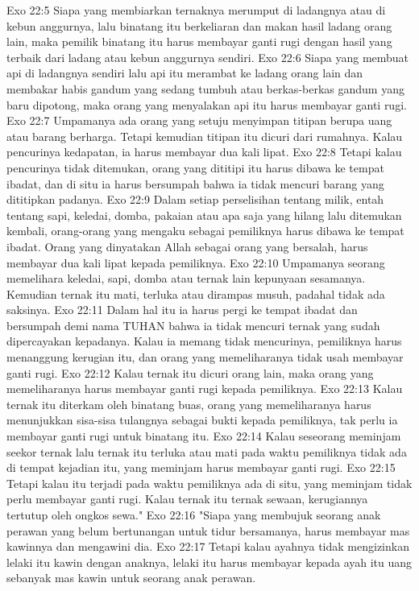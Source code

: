 Exo 22:5  Siapa yang membiarkan ternaknya merumput di ladangnya atau di kebun anggurnya, lalu binatang itu berkeliaran dan makan hasil ladang orang lain, maka pemilik binatang itu harus membayar ganti rugi dengan hasil yang terbaik dari ladang atau kebun anggurnya sendiri.
Exo 22:6  Siapa yang membuat api di ladangnya sendiri lalu api itu merambat ke ladang orang lain dan membakar habis gandum yang sedang tumbuh atau berkas-berkas gandum yang baru dipotong, maka orang yang menyalakan api itu harus membayar ganti rugi.
Exo 22:7  Umpamanya ada orang yang setuju menyimpan titipan berupa uang atau barang berharga. Tetapi kemudian titipan itu dicuri dari rumahnya. Kalau pencurinya kedapatan, ia harus membayar dua kali lipat.
Exo 22:8  Tetapi kalau pencurinya tidak ditemukan, orang yang dititipi itu harus dibawa ke tempat ibadat, dan di situ ia harus bersumpah bahwa ia tidak mencuri barang yang dititipkan padanya.
Exo 22:9  Dalam setiap perselisihan tentang milik, entah tentang sapi, keledai, domba, pakaian atau apa saja yang hilang lalu ditemukan kembali, orang-orang yang mengaku sebagai pemiliknya harus dibawa ke tempat ibadat. Orang yang dinyatakan Allah sebagai orang yang bersalah, harus membayar dua kali lipat kepada pemiliknya.
Exo 22:10  Umpamanya seorang memelihara keledai, sapi, domba atau ternak lain kepunyaan sesamanya. Kemudian ternak itu mati, terluka atau dirampas musuh, padahal tidak ada saksinya.
Exo 22:11  Dalam hal itu ia harus pergi ke tempat ibadat dan bersumpah demi nama TUHAN bahwa ia tidak mencuri ternak yang sudah dipercayakan kepadanya. Kalau ia memang tidak mencurinya, pemiliknya harus menanggung kerugian itu, dan orang yang memeliharanya tidak usah membayar ganti rugi.
Exo 22:12  Kalau ternak itu dicuri orang lain, maka orang yang memeliharanya harus membayar ganti rugi kepada pemiliknya.
Exo 22:13  Kalau ternak itu diterkam oleh binatang buas, orang yang memeliharanya harus menunjukkan sisa-sisa tulangnya sebagai bukti kepada pemiliknya, tak perlu ia membayar ganti rugi untuk binatang itu.
Exo 22:14  Kalau seseorang meminjam seekor ternak lalu ternak itu terluka atau mati pada waktu pemiliknya tidak ada di tempat kejadian itu, yang meminjam harus membayar ganti rugi.
Exo 22:15  Tetapi kalau itu terjadi pada waktu pemiliknya ada di situ, yang meminjam tidak perlu membayar ganti rugi. Kalau ternak itu ternak sewaan, kerugiannya tertutup oleh ongkos sewa."
Exo 22:16  "Siapa yang membujuk seorang anak perawan yang belum bertunangan untuk tidur bersamanya, harus membayar mas kawinnya dan mengawini dia.
Exo 22:17  Tetapi kalau ayahnya tidak mengizinkan lelaki itu kawin dengan anaknya, lelaki itu harus membayar kepada ayah itu uang sebanyak mas kawin untuk seorang anak perawan.
